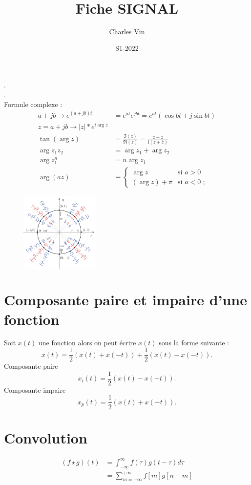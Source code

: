 \documentclass{article}
\title{Fiche SIGNAL}
\author{Charles Vin}
\date{S1-2022}
\theoremstyle{plain}%
\theoremstyle{definition}
\theoremstyle{remark}
\begin{document}
\maketitle
\tableofcontents


. \\
. \\
Formule complexe : 
\begin{align*}
    a + jb \to e^{(a+jb)t} &= e^{at}e^{jbt} = e^{at}(\cos bt + j \sin bt) \\
    z = a + jb \to \left| z \right| * e^{i \arg z} \\
    \tan(\arg z)&={\frac {\Im (z)}{\Re (z)}}={\frac {z-{\bar {z}}}{\mathrm {i} \left(z+{\bar {z}}\right)}} \\
    \arg z_1z_2 &= \arg z_1 + \arg z_2 \\
    \arg z_1^n &= n\arg z_1 \\
    \arg(az) &\equiv {\begin{cases}\arg z&{\text{si }}a>0\\(\arg z)+\pi &{\text{si }}a<0{\text{ ;}}\end{cases}}
\end{align*}

\begin{figure}[!htbp]
    \centering
    \includegraphics*[width=0.35\textwidth]{cercle_trigo.png}
\end{figure}
    
\section{Composante paire et impaire d'une fonction}
Soit $ x(t) $ une fonction alors on peut écrire $ x(t) $ sous la forme suivante : 
\[
    x(t) = \frac{1}{2}(x(t) + x(-t)) + \frac{1}{2}(x(t) - x(-t))
.\]
Composante paire 
\[
    x_i(t) = \frac{1}{2}(x(t) - x(-t))
.\]
Composante impaire 
\[
    x_p(t) = \frac{1}{2}(x(t) + x(-t))
.\]

\section{Convolution}
\begin{align*}
    (f \star g)(t) &= \int _{-\infty }^{\infty }f(\tau )g(t-\tau )d\tau \\
                    &= \sum_{m=-\infty }^{+\infty} f[m]g[n - m]
\end{align*}
\end{document}
